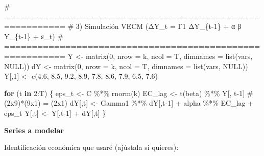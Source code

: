 \documentclass[
  spanish,
  letterpaper,
  DIV=11,
  numbers=noendperiod]{scrartcl}
\newenvironment{Shaded}{\begin{snugshade}}{\end{snugshade}}
\newcommand{\AttributeTok}[1]{\textcolor[rgb]{0.40,0.45,0.13}{#1}}
\newcommand{\CommentTok}[1]{\textcolor[rgb]{0.37,0.37,0.37}{#1}}
\newcommand{\ConstantTok}[1]{\textcolor[rgb]{0.56,0.35,0.01}{#1}}
\newcommand{\ControlFlowTok}[1]{\textcolor[rgb]{0.00,0.23,0.31}{\textbf{#1}}}
\newcommand{\DecValTok}[1]{\textcolor[rgb]{0.68,0.00,0.00}{#1}}
\newcommand{\FloatTok}[1]{\textcolor[rgb]{0.68,0.00,0.00}{#1}}
\newcommand{\FunctionTok}[1]{\textcolor[rgb]{0.28,0.35,0.67}{#1}}
\newcommand{\NormalTok}[1]{\textcolor[rgb]{0.00,0.23,0.31}{#1}}
\newcommand{\OtherTok}[1]{\textcolor[rgb]{0.00,0.23,0.31}{#1}}
\newcommand{\SpecialCharTok}[1]{\textcolor[rgb]{0.37,0.37,0.37}{#1}}
\begin{document}
\begin{Shaded}
\begin{Highlighting}[]
\CommentTok{\# =========================================================}
\CommentTok{\# 3) Simulación VECM (ΔY\_t = Γ1 ΔY\_\{t{-}1\} + α β\textquotesingle{} Y\_\{t{-}1\} + ε\_t)}
\CommentTok{\# =========================================================}
\NormalTok{Y  }\OtherTok{\textless{}{-}} \FunctionTok{matrix}\NormalTok{(}\DecValTok{0}\NormalTok{, }\AttributeTok{nrow =}\NormalTok{ k, }\AttributeTok{ncol =}\NormalTok{ T, }\AttributeTok{dimnames =} \FunctionTok{list}\NormalTok{(vars, }\ConstantTok{NULL}\NormalTok{))}
\NormalTok{dY }\OtherTok{\textless{}{-}} \FunctionTok{matrix}\NormalTok{(}\DecValTok{0}\NormalTok{, }\AttributeTok{nrow =}\NormalTok{ k, }\AttributeTok{ncol =}\NormalTok{ T, }\AttributeTok{dimnames =} \FunctionTok{list}\NormalTok{(vars, }\ConstantTok{NULL}\NormalTok{))}
\NormalTok{Y[,}\DecValTok{1}\NormalTok{] }\OtherTok{\textless{}{-}} \FunctionTok{c}\NormalTok{(}\FloatTok{4.6}\NormalTok{, }\FloatTok{8.5}\NormalTok{, }\FloatTok{9.2}\NormalTok{, }\FloatTok{8.9}\NormalTok{, }\FloatTok{7.8}\NormalTok{, }\FloatTok{8.6}\NormalTok{, }\FloatTok{7.9}\NormalTok{, }\FloatTok{6.5}\NormalTok{, }\FloatTok{7.6}\NormalTok{)}

\ControlFlowTok{for}\NormalTok{ (t }\ControlFlowTok{in} \DecValTok{2}\SpecialCharTok{:}\NormalTok{T) \{}
\NormalTok{  eps\_t  }\OtherTok{\textless{}{-}}\NormalTok{ C }\SpecialCharTok{\%*\%} \FunctionTok{rnorm}\NormalTok{(k)}
\NormalTok{  EC\_lag }\OtherTok{\textless{}{-}} \FunctionTok{t}\NormalTok{(beta) }\SpecialCharTok{\%*\%}\NormalTok{ Y[, t}\DecValTok{{-}1}\NormalTok{]           }\CommentTok{\# (2x9)*(9x1) = (2x1)}
\NormalTok{  dY[,t] }\OtherTok{\textless{}{-}}\NormalTok{ Gamma1 }\SpecialCharTok{\%*\%}\NormalTok{ dY[,t}\DecValTok{{-}1}\NormalTok{] }\SpecialCharTok{+}\NormalTok{ alpha }\SpecialCharTok{\%*\%}\NormalTok{ EC\_lag }\SpecialCharTok{+}\NormalTok{ eps\_t}
\NormalTok{  Y[,t]  }\OtherTok{\textless{}{-}}\NormalTok{ Y[,t}\DecValTok{{-}1}\NormalTok{] }\SpecialCharTok{+}\NormalTok{ dY[,t]}
\NormalTok{\}}
\end{Highlighting}
\end{Shaded}

\textbf{Series a modelar}

Identificación económica que usaré (ajústala si quieres):
\end{document}
